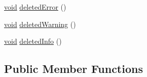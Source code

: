 \begin{DoxyCompactItemize}
\item 
\hyperlink{group___u_a_v_objects_plugin_ga444cf2ff3f0ecbe028adce838d373f5c}{void} \hyperlink{group___core_plugin_gae1c36dd9dd0467e3ca267b646a995c6f}{deleted\-Error} ()
\item 
\hyperlink{group___u_a_v_objects_plugin_ga444cf2ff3f0ecbe028adce838d373f5c}{void} \hyperlink{group___core_plugin_gabee55cc28f8b283a56070361824df749}{deleted\-Warning} ()
\item 
\hyperlink{group___u_a_v_objects_plugin_ga444cf2ff3f0ecbe028adce838d373f5c}{void} \hyperlink{group___core_plugin_ga70309ce7fad88a9fcf38589659e511eb}{deleted\-Info} ()
\end{DoxyCompactItemize}
\subsection*{Public Member Functions}
